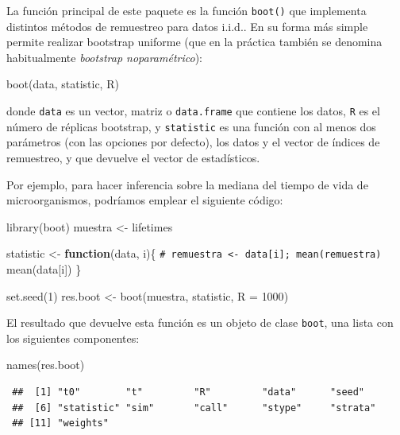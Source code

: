 \documentclass[
  10pt,
]{book}
\newenvironment{Shaded}{\begin{snugshade}}{\end{snugshade}}
\newcommand{\AttributeTok}[1]{\textcolor[rgb]{0.77,0.63,0.00}{#1}}
\newcommand{\CommentTok}[1]{\textcolor[rgb]{0.56,0.35,0.01}{\textit{#1}}}
\newcommand{\ControlFlowTok}[1]{\textcolor[rgb]{0.13,0.29,0.53}{\textbf{#1}}}
\newcommand{\DecValTok}[1]{\textcolor[rgb]{0.00,0.00,0.81}{#1}}
\newcommand{\FunctionTok}[1]{\textcolor[rgb]{0.00,0.00,0.00}{#1}}
\newcommand{\NormalTok}[1]{#1}
\newcommand{\OtherTok}[1]{\textcolor[rgb]{0.56,0.35,0.01}{#1}}
\theoremstyle{break}
\theoremstyle{nonumberplain}
\renewcommand{\CommentTok}[1]{\textcolor[rgb]{0.41,0.41,0.41}{\texttt{#1}}}
\begin{document}
La función principal de este paquete es la función \texttt{boot()} que implementa distintos métodos de remuestreo para datos i.i.d..
En su forma más simple permite realizar bootstrap uniforme (que en la práctica también se denomina habitualmente \emph{bootstrap noparamétrico}):

\begin{Shaded}
\begin{Highlighting}[]
\FunctionTok{boot}\NormalTok{(data, statistic, R)}
\end{Highlighting}
\end{Shaded}

donde \texttt{data} es un vector, matriz o \texttt{data.frame} que contiene los datos,
\texttt{R} es el número de réplicas bootstrap, y \texttt{statistic} es una función
con al menos dos parámetros (con las opciones por defecto),
los datos y el vector de índices de remuestreo,
y que devuelve el vector de estadísticos.

Por ejemplo, para hacer inferencia sobre la mediana del tiempo de vida de microorganismos,
podríamos emplear el siguiente código:

\begin{Shaded}
\begin{Highlighting}[]
\FunctionTok{library}\NormalTok{(boot)}
\NormalTok{muestra }\OtherTok{\textless{}{-}}\NormalTok{ lifetimes}

\NormalTok{statistic }\OtherTok{\textless{}{-}} \ControlFlowTok{function}\NormalTok{(data, i)\{}
  \CommentTok{\# remuestra \textless{}{-} data[i]; mean(remuestra)}
  \FunctionTok{mean}\NormalTok{(data[i])}
\NormalTok{\}}

\FunctionTok{set.seed}\NormalTok{(}\DecValTok{1}\NormalTok{)}
\NormalTok{res.boot }\OtherTok{\textless{}{-}} \FunctionTok{boot}\NormalTok{(muestra, statistic, }\AttributeTok{R =} \DecValTok{1000}\NormalTok{)}
\end{Highlighting}
\end{Shaded}

El resultado que devuelve esta función es un objeto de clase \texttt{boot}, una lista con los siguientes componentes:

\begin{Shaded}
\begin{Highlighting}[]
\FunctionTok{names}\NormalTok{(res.boot)}
\end{Highlighting}
\end{Shaded}

\begin{verbatim}
 ##  [1] "t0"        "t"         "R"         "data"      "seed"     
 ##  [6] "statistic" "sim"       "call"      "stype"     "strata"   
 ## [11] "weights"
\end{verbatim}
\end{document}
